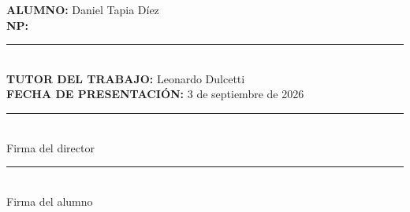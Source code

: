 \begin{flushleft}
  \textbf{ALUMNO:} Daniel Tapia D\'iez\\[0.35cm]
  \textbf{NP:} \rule{4cm}{0.4pt}\\[0.35cm]
  \textbf{TUTOR DEL TRABAJO:} Leonardo Dulcetti\\[1.5cm]
  \textbf{FECHA DE PRESENTACI\'ON:} 3 de septiembre de 2026\\[3cm]
\end{flushleft}

\begin{center}
  \begin{minipage}{0.42\textwidth}
    \centering
    \rule{6cm}{0.4pt}\\
    Firma del director
  \end{minipage}\hfill
  \begin{minipage}{0.42\textwidth}
    \centering
    \rule{6cm}{0.4pt}\\
    Firma del alumno
  \end{minipage}
\end{center}
\cleardoublepage
